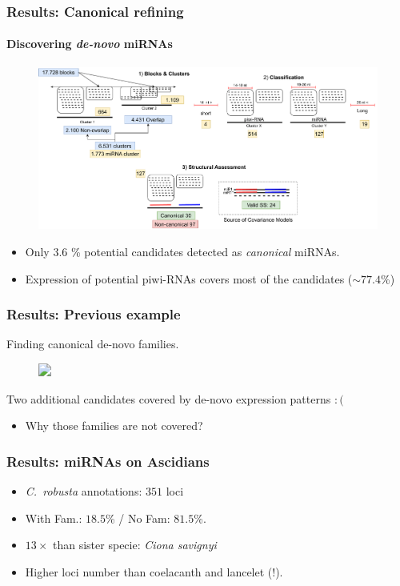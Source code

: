 \begin{frame}[t]
    \frametitle{Results: Canonical refining}
    \framesubtitle{Discovering \textit{de-novo} miRNAs}
    \begin{figure}[h!]
        \centering
        \includegraphics[width=\linewidth]{Figures/results_workflowALL}\label{fig:workflow} %
    \end{figure}
    \begin{itemize}
        \item Only $3.6$ \% potential candidates detected as \textit{canonical} miRNAs.
        \item Expression of potential piwi-RNAs covers most of the candidates ($\sim 77.4$\%)
    \end{itemize}
\end{frame}

\begin{frame}[t]
    \frametitle{Results: Previous example}
    Finding canonical de-novo families.
    \begin{figure}[h!]
        \centering
        \includegraphics<1>[width=\linewidth]{Figures/chr7_cluster} %
    \end{figure}
     Two additional candidates covered by de-novo expression patterns $:($
     \begin{itemize}
         \item Why those families are not covered? 
     \end{itemize}
\end{frame}


\begin{frame}[t]
    \frametitle{Results: miRNAs on Ascidians}
    \begin{itemize}
        \item \textit{C.\ robusta} annotations: $351$ loci
        \item With Fam.: $18.5$\% / No Fam: $81.5$\%.
        \item $13\times$ than sister specie: \textit{Ciona savignyi}
        \item Higher loci number than coelacanth and lancelet (!).
    \end{itemize}
\end{frame}


